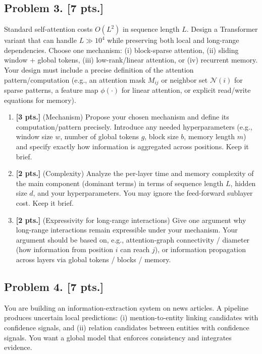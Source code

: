 \documentclass[11pt,a4paper]{article}
\begin{document}
\subsection{Problem 3. [7 pts.]}
Standard self-attention costs $O(L^{2})$ in sequence length $L$. Design a Transformer variant that can handle $L \gg 10^{4}$ while preserving both local and long-range dependencies. Choose one mechanism: (i) block-sparse attention, (ii) sliding window + global tokens, (iii) low-rank/linear attention, or (iv) recurrent memory. Your design must include a precise definition of the attention pattern/computation (e.g., an attention mask $M_{ij}$ or neighbor set $\mathcal{N}(i)$ for sparse patterns, a feature map $\phi(\cdot)$ for linear attention, or explicit read/write equations for memory).
\begin{enumerate}[label=(\alph*)]
    \item \textbf{[3 pts.]} (Mechanism) Propose your chosen mechanism and define its computation/pattern precisely. Introduce any needed hyperparameters (e.g., window size $w$, number of global tokens $g$, block size $b$, memory length $m$) and specify exactly how information is aggregated across positions. Keep it brief.
    \item \textbf{[2 pts.]} (Complexity) Analyze the per-layer time and memory complexity of the main component (dominant terms) in terms of sequence length $L$, hidden size $d$, and your hyperparameters. You may ignore the feed-forward sublayer cost. Keep it brief.
    \item \textbf{[2 pts.]} (Expressivity for long-range interactions) Give one argument why long-range interactions remain expressible under your mechanism. Your argument should be based on, e.g., attention-graph connectivity / diameter (how information from position $i$ can reach $j$), or information propagation across layers via global tokens / blocks / memory.
\end{enumerate}

\subsection{Problem 4. [7 pts.]}
You are building an information-extraction system on news articles. A pipeline produces uncertain local predictions: (i) mention-to-entity linking candidates with confidence signals, and (ii) relation candidates between entities with confidence signals. You want a global model that enforces consistency and integrates evidence.
\end{document}
